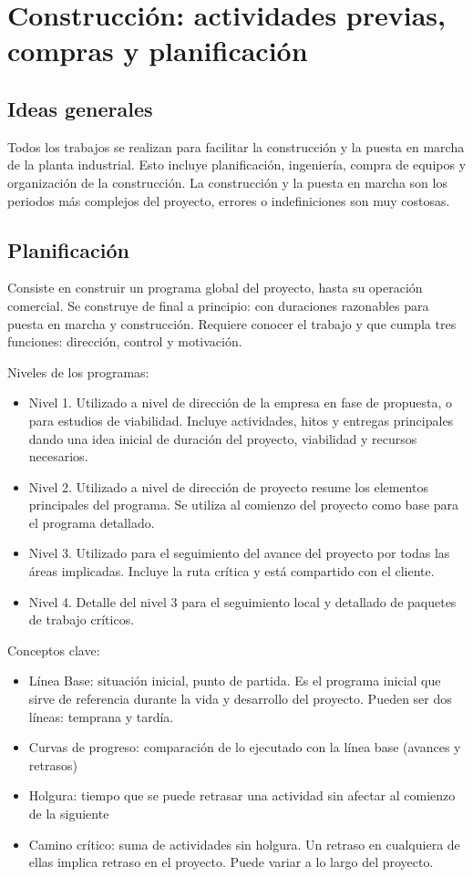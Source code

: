 \section{Construcción: actividades previas, compras y planificación}

\subsection*{Ideas generales}

Todos los trabajos se realizan para facilitar la construcción y la puesta en marcha de la planta industrial. Esto incluye planificación, ingeniería, compra de equipos y organización de la construcción. La construcción y la puesta en marcha son los periodos más complejos del proyecto, errores o indefiniciones son muy costosas.

\subsection*{Planificación}

Consiste en construir un programa global del proyecto, hasta su operación comercial. Se construye de final a principio: con duraciones razonables para puesta en marcha y construcción. Requiere conocer el trabajo y que cumpla tres funciones: dirección, control y motivación.

Niveles de los programas:
\begin{itemize}
    \item Nivel 1. Utilizado a nivel de dirección de la empresa en fase de propuesta, o para estudios de viabilidad. Incluye actividades, hitos y entregas principales dando una idea inicial de duración del proyecto, viabilidad y recursos necesarios.
    \item Nivel 2. Utilizado a nivel de dirección de proyecto resume los elementos principales del programa. Se utiliza al comienzo del proyecto como base para el programa detallado.
    \item Nivel 3. Utilizado para el seguimiento del avance del proyecto por todas las áreas implicadas. Incluye la ruta crítica y está compartido con el cliente.
    \item Nivel 4. Detalle del nivel 3 para el seguimiento local y detallado de paquetes de trabajo críticos.
\end{itemize}

Conceptos clave:
\begin{itemize}
    \item Línea Base: situación inicial, punto de partida. Es el programa inicial que sirve de referencia durante la vida y desarrollo del proyecto. Pueden ser dos líneas: temprana y tardía.
    \item Curvas de progreso: comparación de lo ejecutado con la línea base (avances y retrasos)
    \item Holgura: tiempo que se puede retrasar una actividad sin afectar al comienzo de la siguiente
    \item Camino crítico: suma de actividades sin holgura. Un retraso en cualquiera de ellas implica retraso en el proyecto. Puede variar a lo largo del proyecto.
\end{itemize}

